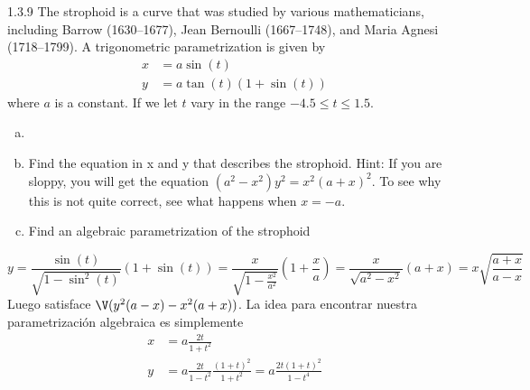 \documentclass[twoside]{article}
\begin{document}
\newpage

\begin{ejercicio}{1.3.9}
The strophoid is a curve that was studied by various mathematicians, including Barrow (1630–1677), Jean Bernoulli (1667–1748), and Maria Agnesi (1718–1799). A trigonometric parametrization is given by
\begin{align*}
x&=a\sin(t)\\
y&=a\tan(t)(1+\sin(t))
\end{align*}
where $a$ is a constant. If we let $t$ vary in the range $−4.5 ≤ t ≤ 1.5$.
\begin{enumerate}[a.]
\item[]
\item Find the equation in x and y that describes the strophoid. Hint: If you are sloppy, you will get the equation $(a^2 − x^2)y^2 = x^2(a + x)^2$. To see why this is not quite correct, see what happens when $x = −a$.
\item Find an algebraic parametrization of the strophoid
\end{enumerate}
\end{ejercicio}
\begin{solucion}
$$
y=\frac{\sin(t)}{\sqrt{1-\sin^2(t)}}(1+\sin(t)) =\frac{x}{\sqrt{1-\frac{x^2}{a^2}}}\left(1+\frac{x}{a}\right)=\frac{x}{\sqrt{a^2-{x^2}}}(a+x) = x\sqrt{\frac{a+x}{a-x}}
$$
Luego satisface $\V(y^2(a-x)-x^2(a+x))$. La idea para encontrar nuestra parametrización algebraica es simplemente
\begin{align*}
x&=a\frac{2t}{1+t^2}\\
y&=a\frac{2t}{1-t^2}\frac{(1+t)^2}{1+t^2} = a\frac{2t(1+t)^2}{1-t^4}
\end{align*}

\end{solucion}
\newpage
\end{document}
